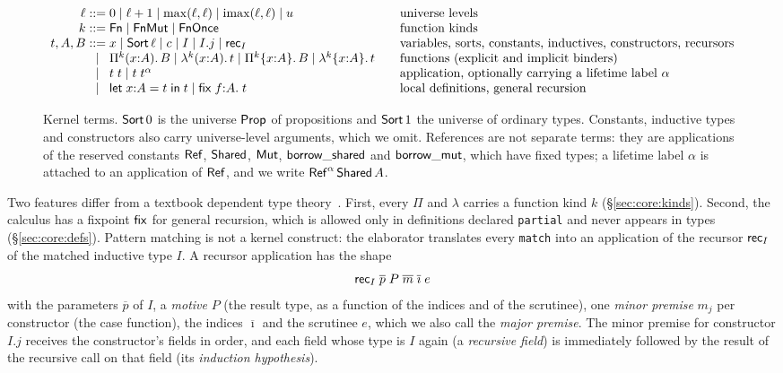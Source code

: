 \begin{figure}[t]
\footnotesize
\[
\begin{array}{@{}r@{\;}c@{\;}l@{\qquad}l@{}}
\ell & ::= & 0 \mid \ell+1 \mid \max(\ell,\ell) \mid \mathrm{imax}(\ell,\ell) \mid u & \text{universe levels}\\
k & ::= & \Fn \mid \FnMut \mid \FnOnce & \text{function kinds}\\
t, A, B & ::= & x \mid \kw{Sort}\,\ell \mid c \mid I \mid I.j \mid \kw{rec}_I & \text{variables, sorts, constants, inductives, constructors, recursors}\\
 & \mid & \Pik{k}(x{:}A).\,B \mid \Lamk{k}(x{:}A).\,t \mid \Pik{k}\{x{:}A\}.\,B \mid \Lamk{k}\{x{:}A\}.\,t & \text{functions (explicit and implicit binders)}\\
 & \mid & t\;t \mid t\;t^{\alpha} & \text{application, optionally carrying a lifetime label } \alpha\\
 & \mid & \kw{let}\;x{:}A = t\;\kw{in}\;t \mid \kw{fix}\;f{:}A.\;t & \text{local definitions, general recursion}
\end{array}
\]
\caption{Kernel terms. $\mathsf{Sort}\,0$ is the universe $\mathsf{Prop}$ of propositions and $\mathsf{Sort}\,1$ the universe of ordinary types. Constants, inductive types and constructors also carry universe-level arguments, which we omit. References are not separate terms: they are applications of the reserved constants $\mathsf{Ref}$, $\mathsf{Shared}$, $\mathsf{Mut}$, $\mathsf{borrow\_shared}$ and $\mathsf{borrow\_mut}$, which have fixed types; a lifetime label $\alpha$ is attached to an application of $\mathsf{Ref}$, and we write $\mathsf{Ref}^{\alpha}\,\mathsf{Shared}\,A$.}
\label{fig:syntax}
\end{figure}

Two features differ from a textbook dependent type theory~\cite{coquand1988,paulinmohring1993}.
First, every $\Pi$ and $\lambda$ carries a function kind $k$ (\S\ref{sec:core:kinds}).
Second, the calculus has a fixpoint $\mathsf{fix}$ for general recursion, which is allowed only in definitions declared \lstinline|partial| and never appears in types (\S\ref{sec:core:defs}).
Pattern matching is not a kernel construct: the elaborator translates every \lstinline|match| into an application of the recursor $\mathsf{rec}_I$ of the matched inductive type $I$.
A recursor application has the shape
\[
\mathsf{rec}_I\;\overline{p}\;P\;\overline{m}\;\overline{\imath}\;e
\]
with the parameters $\overline{p}$ of $I$, a \emph{motive} $P$ (the result type, as a function of the indices and of the scrutinee), one \emph{minor premise} $m_j$ per constructor (the case function), the indices $\overline{\imath}$ and the scrutinee $e$, which we also call the \emph{major premise}.
The minor premise for constructor $I.j$ receives the constructor's fields in order, and each field whose type is $I$ again (a \emph{recursive field}) is immediately followed by the result of the recursive call on that field (its \emph{induction hypothesis}).

